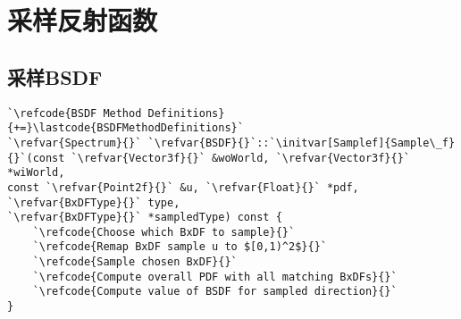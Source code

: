 \section{采样反射函数}\label{sec:采样反射函数}

\subsection{采样BSDF}\label{sub:采样BSDF}
\begin{lstlisting}
`\refcode{BSDF Method Definitions}{+=}\lastcode{BSDFMethodDefinitions}`
`\refvar{Spectrum}{}` `\refvar{BSDF}{}`::`\initvar[Samplef]{Sample\_f}{}`(const `\refvar{Vector3f}{}` &woWorld, `\refvar{Vector3f}{}` *wiWorld,
const `\refvar{Point2f}{}` &u, `\refvar{Float}{}` *pdf, `\refvar{BxDFType}{}` type,
`\refvar{BxDFType}{}` *sampledType) const {
    `\refcode{Choose which BxDF to sample}{}`
    `\refcode{Remap BxDF sample u to $[0,1)^2$}{}`
    `\refcode{Sample chosen BxDF}{}`
    `\refcode{Compute overall PDF with all matching BxDFs}{}`
    `\refcode{Compute value of BSDF for sampled direction}{}`
}
\end{lstlisting}